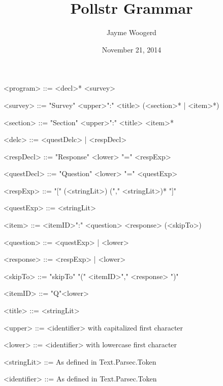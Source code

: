 \documentclass{article}
\title{Pollstr Grammar}
\author{Jayme Woogerd}
\date{November 21, 2014}
\begin{document}
\maketitle
\thispagestyle{empty}

\begin{grammar}

    <program>    ::= <decl>* <survey>

    <survey>     ::= "Survey"  <upper>":" <title> (<section>* | <item>*)

    <section>    ::= "Section" <upper>":" <title> <item>* 

    <delc>       ::= <questDelc> | <respDecl>

    <respDecl>   ::= "Response" <lower> "=" <respExp>

    <questDecl>  ::= "Question" <lower> "=" <questExp>

    <respExp>    ::= "[" (<stringLit>) ("," <stringLit>)* "]"

    <questExp>   ::= <stringLit>

    <item>       ::= <itemID>":" <question> <response> (<skipTo>)

    <question>   ::= <questExp> | <lower>

    <response>   ::= <respExp> | <lower>

    <skipTo>     ::= "skipTo" "(" <itemID>"," <response> ")"

    <itemID>     ::= "Q"<lower>

    <title>      ::= <stringLit>

    <upper>      ::= <identifier> with capitalized first character
    
    <lower>      ::= <identifier> with lowercase first character

    <stringLit>  ::= As defined in Text.Parsec.Token

    <identifier> ::= As defined in Text.Parsec.Token


\end{grammar}
\end{document}
